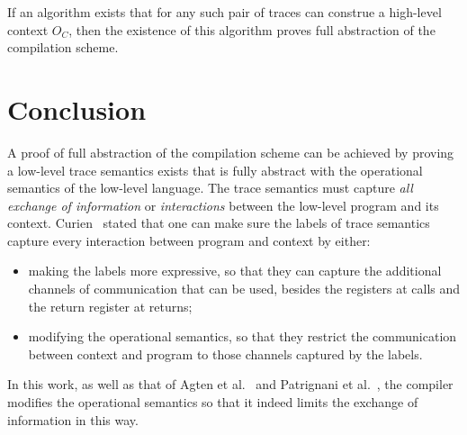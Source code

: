 If an algorithm exists that for any such pair of traces can construe a high-level context $O_C$, then the existence of this algorithm proves full abstraction of the compilation scheme.

\section{Conclusion}
A proof of full abstraction of the compilation scheme can be achieved by proving a low-level trace semantics exists that is fully abstract with the operational semantics of the low-level language.
The trace semantics must capture \emph{all exchange of information} or \emph{interactions} between the low-level program and its context.
Curien~\cite{Curien2007301} stated that one can make sure the labels of trace semantics capture every interaction between program and context by either:
\begin{itemize}
\item making the labels more expressive, so that they can capture the additional channels of communication that can be used, besides the registers at calls and the return register at returns;
\item modifying the operational semantics, so that they restrict the communication between context and program to those channels captured by the labels.
\end{itemize}

In this work, as well as that of Agten et al.~\cite{Agten:2012:SCM:2354412.2355247} and Patrignani et al.~\cite{Patrignani}, the compiler modifies the operational semantics so that it indeed limits the exchange of information in this way.









